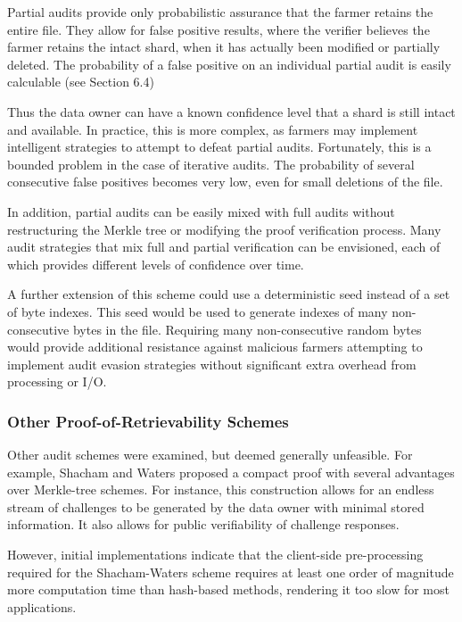 \documentclass[a4paper,10pt]{article}
\begin{document}

Partial audits provide only probabilistic assurance that the farmer retains the entire file. They allow for false positive results, where the verifier believes the farmer retains the intact shard, when it has actually been modified or partially deleted. The probability of a false positive on an individual partial audit is easily calculable (see Section 6.4)

Thus the data owner can have a known confidence level that a shard is still intact and available. In practice, this is more complex, as farmers may implement intelligent strategies to attempt to defeat partial audits. Fortunately, this is a bounded problem in the case of iterative audits. The probability of several consecutive false positives becomes very low, even for small deletions of the file.

In addition, partial audits can be easily mixed with full audits without restructuring the Merkle tree or modifying the proof verification process. Many audit strategies that mix full and partial verification can be envisioned, each of which provides different levels of confidence over time.

A further extension of this scheme could use a deterministic seed instead of a set of byte indexes. This seed would be used to generate indexes of many non-consecutive bytes in the file. Requiring many non-consecutive random bytes would provide additional resistance against malicious farmers attempting to implement audit evasion strategies without significant extra overhead from processing or I/O.

\subsubsection{Other Proof-of-Retrievability Schemes}
Other audit schemes were examined, but deemed generally unfeasible. For example, Shacham and Waters proposed a compact proof \cite{6} with several advantages over Merkle-tree schemes. For instance, this construction allows for an endless stream of challenges to be generated by the data owner with minimal stored information. It also allows for public verifiability of challenge responses.

However, initial implementations indicate that the client-side pre-processing required for the Shacham-Waters scheme requires at least one order of magnitude more computation time than hash-based methods, rendering it too slow for most applications.
\end{document}
